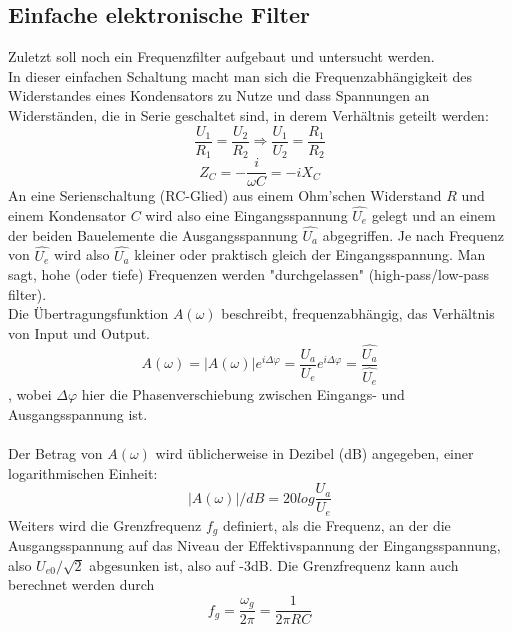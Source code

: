 \documentclass[12pt,a4paper]{article}
\begin{document}
\begin{multicols}{2}
\subsection{Einfache elektronische Filter}
Zuletzt soll noch ein Frequenzfilter aufgebaut und untersucht werden.\\
In dieser einfachen Schaltung macht man sich die Frequenzabhängigkeit des Widerstandes eines Kondensators zu Nutze und dass Spannungen an Widerständen, die in Serie geschaltet sind, in derem Verhältnis geteilt werden:
$$\frac{U_1}{R_1}=\frac{U_2}{R_2} \Rightarrow \frac{U_1}{U_2}=\frac{R_1}{R_2} $$
$$Z_C=-\frac{i}{\omega C}=-i X_C$$
An eine Serienschaltung (RC-Glied) aus einem Ohm'schen Widerstand $R$ und einem Kondensator $C$ wird also eine Eingangsspannung $\hat{U_e}$ gelegt und an einem der beiden Bauelemente die Ausgangsspannung $\hat{U_a}$ abgegriffen. Je nach Frequenz von $\hat{U_e}$ wird also $\hat{U_a}$ kleiner oder praktisch gleich der Eingangsspannung. Man sagt, hohe (oder tiefe) Frequenzen werden "durchgelassen" (high-pass/low-pass filter).\\
Die Übertragungsfunktion $A(\omega)$ beschreibt, frequenzabhängig, das Verhältnis von Input und Output.
$$A(\omega)=|A(\omega)|e^{i\Delta \varphi}=\frac{U_a}{U_e}e^{i\Delta \varphi}=\frac{\hat{U_a}}{\hat{U_e}}$$
, wobei $\Delta \varphi$ hier die Phasenverschiebung zwischen Eingangs- und Ausgangsspannung ist.\\
\\
Der Betrag von $A(\omega)$ wird üblicherweise in Dezibel (dB) angegeben, einer logarithmischen Einheit:
$$|A(\omega)| / dB = 20 log{\frac{U_a}{U_e}}$$
Weiters wird die Grenzfrequenz $f_g$ definiert, als die Frequenz, an der die Ausgangsspannung auf das Niveau der Effektivspannung der Eingangsspannung, also $U_{e0}/\sqrt{2}$ abgesunken ist, also auf -3dB. Die Grenzfrequenz kann auch berechnet werden durch
$$f_g=\frac{\omega_g}{2 \pi}= \frac{1}{2 \pi RC}$$


\end{multicols}
\end{document}
